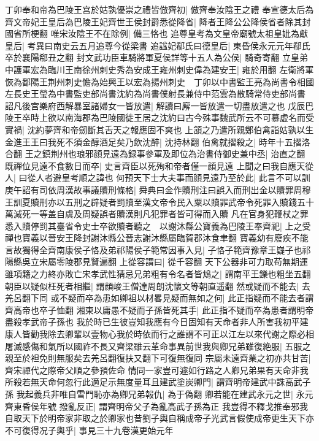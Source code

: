丁卯奉和帝為巴陵王宫於姑孰優崇之禮皆倣齊初|{
	倣齊奉汝陰王之禮}
奉宣德太后為齊文帝妃王皇后為巴陵王妃齊世王侯封爵悉從降省|{
	降者王降公公降侯省者除其封國省所梗翻}
唯宋汝陰王不在除例|{
	備三恪也}
追尊皇考為文皇帝廟號太祖皇妣為獻皇后|{
	考異曰南史云五月追尊今從梁書}
追諡妃郗氏曰德皇后|{
	東昏侯永元元年郗氏卒於襄陽郗丑之翻}
封文武功臣車騎將軍夏侯詳等十五人為公侯|{
	騎奇寄翻}
立皇弟中護軍宏為臨川王南徐州刺史秀為安成王雍州刺史偉為建安王|{
	雍於用翻}
左衛將軍恢為鄱陽王荆州刺史憺為始興王以宏為揚州刺史　丁卯以中書監王亮為尚書令相國左長史王瑩為中書監吏部尚書沈約為尚書僕射長兼侍中范雲為散騎常侍吏部尚書　詔凡後宫樂府西解暴室諸婦女一皆放遣|{
	解讀曰廨一皆放遣一切盡放遣之也}
戊辰巴陵王卒時上欲以南海郡為巴陵國徙王居之沈約曰古今殊事魏武所云不可慕虚名而受實禍|{
	沈約夢齊和帝劒斷其舌天之報應固不爽也}
上頷之乃遣所親鄭伯禽詣姑孰以生金進王王曰我死不須金醇酒足矣乃飲沈醉|{
	沈持林翻}
伯禽就摺殺之|{
	時年十五摺洛合翻}
王之鎮荆州也琅邪顔見遠為録事參軍及即位為治書侍御史兼中丞|{
	治直之翻}
既禪位見遠不食數日而卒|{
	史言齊臣以死殉和帝者僅一顔見遠}
上聞之曰我自應天從人|{
	曰從人者避皇考順之諱也}
何預天下士大夫事而顔見遠乃至於此|{
	此言不可以訓}
庚午詔有司依周漢故事議贖刑條格|{
	舜典曰金作贖刑注曰誤入而刑出金以贖罪周穆王訓夏贖刑亦以五刑之辟疑者罰贖至漢文帝令民入粟以贖罪武帝令死罪入贖錢五十萬減死一等盖自虞及周疑誤者贖漢則凡犯罪者皆可得而入贖}
凡在官身犯鞭杖之罪悉入贖停罰其臺省令史士卒欲贖者聽之　以謝沐縣公寶義為巴陵王奉齊祀|{
	上之受禪也寶義以晉安王降封謝沐縣公晉志謝沐縣屬臨賀郡沐食聿翻}
寶義幼有廢疾不能言故獨得全齊南康侯子恪及弟祁陽侯子範常因事入見|{
	子恪子範齊豫章王嶷子也祁陽縣吳立宋屬零陵郡見賢遍翻}
上從容謂曰|{
	從千容翻}
天下公器非可力取苟無期運雖項籍之力終亦敗亡宋孝武性猜忌兄弟粗有令名者皆鴆之|{
	謂南平王鑠也粗坐五翻}
朝臣以疑似枉死者相繼|{
	謂顔峻王僧達周朗沈懷文等朝直遥翻}
然或疑而不能去|{
	去羌呂翻下同}
或不疑而卒為患如卿祖以材畧見疑而無如之何|{
	此正指疑而不能去者謂齊高帝也卒子恤翻}
湘東以庸愚不疑而子孫皆死其手|{
	此正指不疑而卒為患者謂明帝盡殺孝武帝子孫也}
我於時已生彼豈知我應有今日固知有天命者非人所害我初平建康人皆勸我除去卿輩以壹物心我於時依而行之誰謂不可正以江左以來代謝之際必相屠滅感傷和氣所以國祚不長又齊梁雖云革命事異前世我與卿兄弟雖復絶服|{
	五服之親至於袒免則無服矣去羌呂翻復扶又翻下可復無復同}
宗屬未遠齊業之初亦共甘苦|{
	齊宋禪代之際帝父順之參預佐命}
情同一家豈可遽如行路之人卿兄弟果有天命非我所殺若無天命何忽行此適足示無度量耳且建武塗炭卿門|{
	謂齊明帝建武中誅高武子孫}
我起義兵非唯自雪門恥亦為卿兄弟報仇|{
	為于偽翻}
卿若能在建武永元之世|{
	永元齊東昏侯年號}
撥亂反正|{
	謂齊明帝父子為亂高武子孫為正}
我豈得不釋戈推奉邪我自取天下於明帝家非取之於卿家也昔劉子輿自稱成帝子光武言假使成帝更生天下亦不可復得况子輿乎|{
	事見三十九卷漢更始元年}

